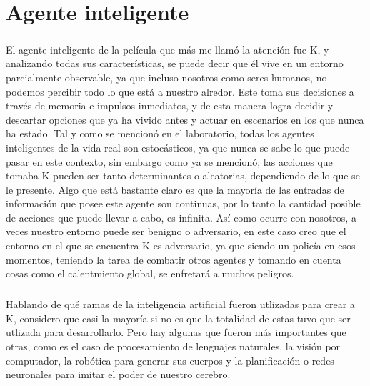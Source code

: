 \documentclass{scrreprt}
\begin{document}
\chapter{Agente inteligente}

\paragraph{}El agente inteligente de la película que más me llamó la atención fue K, y analizando todas sus características, se puede decir que él vive en un entorno parcialmente observable, ya que incluso nosotros como seres humanos, no podemos percibir todo lo que está a nuestro alredor. Este toma sus decisiones a través de memoria e impulsos inmediatos, y de esta manera logra decidir y descartar opciones que ya ha vivido antes y actuar en escenarios en los que nunca ha estado. Tal y como se mencionó en el laboratorio, todas los agentes inteligentes de la vida real son estocásticos, ya que nunca se sabe lo que puede pasar en este contexto, sin embargo como ya se mencionó, las acciones que tomaba K pueden ser tanto determinantes o aleatorias, dependiendo de lo que se le presente. Algo que está bastante claro es que la mayoría de las entradas de información que posee este agente son continuas, por lo tanto la cantidad posible de acciones que puede llevar a cabo, es infinita. Así como ocurre con nosotros, a veces nuestro entorno puede ser benigno o adversario, en este caso creo que el entorno en el que se encuentra K es adversario, ya que siendo un policía en esos momentos, teniendo la tarea de combatir otros agentes y tomando en cuenta cosas como el calentmiento global, se enfretará a muchos peligros.

\paragraph{}Hablando de qué ramas de la inteligencia artificial fueron utlizadas para crear a K, considero que casi la mayoría si no es que la totalidad de estas tuvo que ser utlizada para desarrollarlo. Pero hay algunas que fueron más importantes que otras, como es el caso de procesamiento de lenguajes naturales, la visión por computador, la robótica para generar sus cuerpos y la planificación o redes neuronales para imitar el poder de nuestro cerebro.
\end{document}
